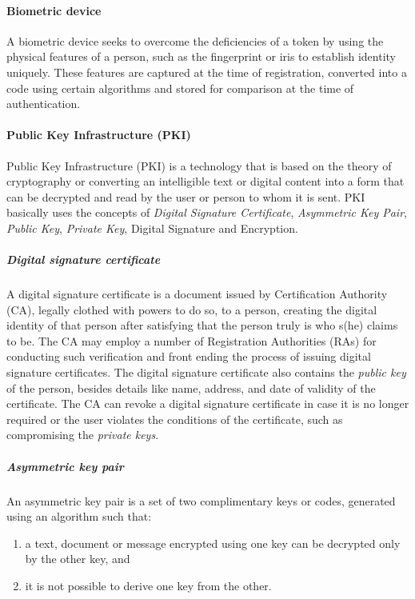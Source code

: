 \paragraph*{Biometric device}
 A biometric device seeks to overcome the deficiencies of a token by using the
 physical features of a person, such as the fingerprint or iris to establish identity uniquely.
 These features are captured at the time of registration, converted into a code using certain
 algorithms and stored for comparison at the time of authentication. 
 
 \paragraph*{Public Key Infrastructure (PKI)}
 Public Key Infrastructure (PKI) is a technology that is based on the theory of cryptography or converting an intelligible text or digital content into a form that can be
 decrypted and read by the user or person to whom it is sent. PKI basically uses the
 concepts of \textit{Digital Signature Certificate}, \textit{Asymmetric Key Pair}, \textit{Public Key}, \textit{Private Key}, Digital Signature and Encryption. 
 
 \subparagraph*{Digital signature certificate}
 A digital signature certificate is a document issued by Certification Authority (CA), legally clothed with powers to do so, to a person, creating the digital
 identity of that person after satisfying that the person truly is who s(he)
 claims to be. The CA may employ a number of Registration Authorities (RAs) for
 conducting such verification and front ending the process of issuing digital
 signature certificates. The digital signature certificate also contains the \textit{public key}
 of the person, besides details like name, address, and date of
 validity of the certificate. The CA can revoke a digital signature certificate in case
 it is no longer required or the user violates the conditions of the certificate, such
 as compromising the \textit{private keys}.
 
 \subparagraph*{Asymmetric key pair}
 An asymmetric key pair is a set of two complimentary keys or codes, generated
 using an algorithm such that:
 \begin{enumerate}[label=(\alph*)]
 	\item  a text, document or message encrypted using one key can be decrypted only by the other key, and
 	\item it is not possible to derive one key from the other.
 \end{enumerate}

